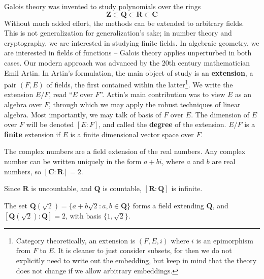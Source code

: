 Galois theory was invented to study polynomials over the rings
%
\[ \mathbf{Z} \subset \mathbf{Q} \subset \mathbf{R} \subset \mathbf{C} \]
%
Without much added effort, the methods can be extended to arbitrary fields. This is not generalization for generalization's sake; in number theory and cryptography, we are interested in studying finite fields. In algebraic geometry, we are interested in fields of functions -- Galois theory applies unperturbed in both cases. Our modern approach was advanced by the 20th century mathematician Emil Artin. In Artin's formulation, the main object of study is an {\bf extension}, a pair $(F,E)$ of fields, the first contained within the latter\footnote{Category theoretically, an extension is $(F,E,i)$ where $i$ is an epimorphism from $F$ to $E$. It is cleaner to just consider subsets, for then we do not explicitly need to write out the embedding, but keep in mind that the theory does not change if we allow arbitrary embeddings.}. We write the extension $E/F$, read ``$E$ over $F$''. Artin's main contribution was to view $E$ as an algebra over $F$, through which we may apply the robust techniques of linear algebra. Most importantly, we may talk of basis of $F$ over $E$. The dimension of $E$ over $F$ will be denoted $[E:F]$, and called the {\bf degree} of the extension. $E/F$ is a {\bf finite} extension if $E$ is a finite dimensional vector space over $F$.

\begin{example}
    The complex numbers are a field extension of the real numbers. Any complex number can be written uniquely in the form $a + bi$, where $a$ and $b$ are real numbers, so $[\mathbf{C}: \mathbf{R}] = 2$.
\end{example}

\begin{example}
    Since $\mathbf{R}$ is uncountable, and $\mathbf{Q}$ is countable, $[\mathbf{R}: \mathbf{Q}]$ is infinite.
\end{example}

\begin{example}
    The set $\mathbf{Q}(\sqrt{2}) = \{ a + b \sqrt{2} : a,b \in \mathbf{Q} \}$ forms a field extending $\mathbf{Q}$, and $[\mathbf{Q}(\sqrt{2}): \mathbf{Q}] = 2$, with basis $\{ 1, \sqrt{2} \}$.
\end{example}


